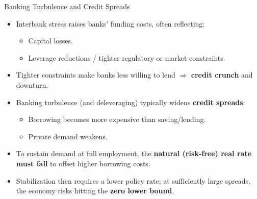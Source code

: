 \documentclass[11pt,aspectratio=169]{beamer}
\begin{document}
\begin{frame}{Banking Turbulence and Credit Spreads}
\small
\begin{itemize}
  \item Interbank stress raises banks' funding costs, often reflecting:
  \begin{itemize}
    \item Capital losses.
    \item Leverage reductions / tighter regulatory or market constraints.
  \end{itemize}
  \vspace{0.3em}
  \item Tighter constraints make banks less willing to lend $\Rightarrow$ \textbf{credit crunch} and downturn.
  \vspace{0.3em}
  \item Banking turbulence (and deleveraging) typically widens \textbf{credit spreads}:
  \begin{itemize}
    \item Borrowing becomes more expensive than saving/lending.
    \item Private demand weakens.
  \end{itemize}
  \vspace{0.3em}
  \item To sustain demand at full employment, the \textbf{natural (risk-free) real rate must fall} to offset higher borrowing costs.
  \vspace{0.3em}
  \item Stabilization then requires a lower policy rate; at sufficiently large spreads, the economy risks hitting the \textbf{zero lower bound}.
\end{itemize}
\end{frame}
\end{document}
